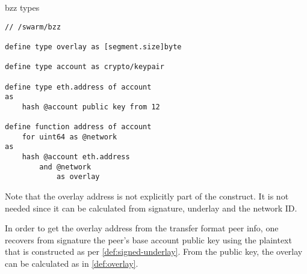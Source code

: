 \begin{definition}{bzz types}\label{def:bzz-types}
\begin{lstlisting}[language=buzz1]
// /swarm/bzz

define type overlay as [segment.size]byte

define type account as crypto/keypair

define type eth.address of account 
as
    hash @account public key from 12

define function address of account 
    for uint64 as @network
as
    hash @account eth.address
        and @network 
            as overlay

\end{lstlisting}
\end{definition}

Note that the overlay address is not explicitly part of the construct. It is not needed since it can be calculated from signature, underlay and the network ID.



In order to get the overlay address from the transfer format peer info, one recovers from signature the peer's base account public key using the plaintext that is constructed as per \ref{def:signed-underlay}. From the public key, the overlay can be calculated as in \ref{def:overlay}.
